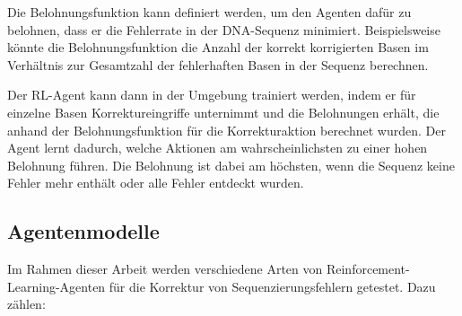\documentclass[oneside,bibliography=totocnumbered,BCOR=5mm]{scrbook}%
\theoremstyle{definition}
\theoremstyle{definition}
\theoremstyle{definition}
\theoremstyle{definition}
\theoremstyle{definition}
\theoremstyle{definition}
\begin{document}
Die Belohnungsfunktion kann definiert werden, um den Agenten dafür zu belohnen, 
dass er die Fehlerrate in der DNA-Sequenz minimiert. 
Beispielsweise könnte die Belohnungsfunktion die Anzahl der korrekt korrigierten Basen im 
Verhältnis zur Gesamtzahl der fehlerhaften Basen in der Sequenz berechnen.


Der RL-Agent kann dann in der Umgebung trainiert werden, indem er für einzelne Basen Korrektureingriffe unternimmt 
und die Belohnungen erhält, die anhand der Belohnungsfunktion für die Korrekturaktion berechnet wurden. 
Der Agent lernt dadurch, welche Aktionen am wahrscheinlichsten zu einer hohen Belohnung führen.
Die Belohnung ist dabei am höchsten, wenn die Sequenz keine Fehler mehr enthält oder alle Fehler entdeckt wurden.

\subsection{Agentenmodelle}

Im Rahmen dieser Arbeit werden verschiedene Arten von Reinforcement-Learning-Agenten
für die Korrektur von Sequenzierungsfehlern getestet. Dazu zählen:
\end{document}
